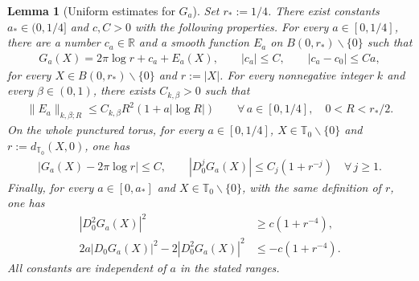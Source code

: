 \documentclass[a4paper,11pt,oneside,reqno]{amsart}
\numberwithin{equation}{section}
\newtheorem{lemma}[theorem]{Lemma}
\theoremstyle{definition}
\begin{document}
\begin{lemma}[Uniform estimates for $G_a$]
    \label{lem:s4-Green}
    Set $r_*:=1/4$. There exist constants
    $a_*\in(0,1/4]$ and $c,C>0$ with the following
    properties. For every $a\in[0,1/4]$, there are a number
    $c_a\in\mathbb R$ and a smooth function $E_a$ on
    $B(0,r_*)\smallsetminus\{0\}$ such that
    \begin{align}
        \label{eq:s4-Green-local}
        G_a(X)=2\pi\log r+c_a+E_a(X),
        \qquad |c_a|\leq C,\qquad |c_a-c_0|\leq Ca,
    \end{align}
    for every $X\in B(0,r_*)\smallsetminus\{0\}$ and
    $r:=|X|$. For every nonnegative integer $k$ and every
    $\beta\in(0,1)$, there exists $C_{k,\beta}>0$ such that
    \begin{align}
        \label{eq:s4-Green-remainder}
        \|E_a\|_{k,\beta;R}
        \leq C_{k,\beta}R^2(1+a|\log R|)
        \qquad\forall\,a\in[0,1/4],\quad 0<R<r_*/2.
    \end{align}
    On the whole punctured torus, for every
    $a\in[0,1/4]$, $X\in\mathbb T_0\smallsetminus\{0\}$
    and $r:=d_{\mathbb T_0}(X,0)$, one has
    \begin{align}
        \label{eq:s4-Green-global}
        |G_a(X)-2\pi\log r|\leq C,
        \qquad |D_0^jG_a(X)|\leq C_j(1+r^{-j})
        \quad\forall\,j\geq1.
    \end{align}
    Finally, for every $a\in[0,a_*]$ and
    $X\in\mathbb T_0\smallsetminus\{0\}$, with the same
    definition of $r$, one has
    \begin{align}
        \label{eq:s4-Green-Hessian}
        |D_0^2G_a(X)|^2&\geq c(1+r^{-4}),\nonumber\\
        2a|D_0G_a(X)|^2-2|D_0^2G_a(X)|^2
        &\leq-c(1+r^{-4}).
    \end{align}
    All constants are independent of $a$ in the stated ranges.
\end{lemma}
\end{document}
